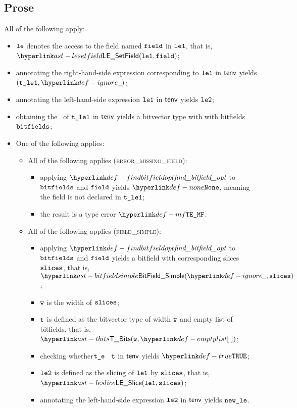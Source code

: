 \subsection{Prose}
All of the following apply:
\begin{itemize}
  \item $\texttt{le}$ denotes the access to the field named $\texttt{field}$ in $\texttt{le1}$, that is, \\ $\LESetField(\vleone, \field)$;
  \item annotating the right-hand-side expression corresponding to $\texttt{le1}$ in $\textsf{tenv}$ yields \\ $(\vtleone, \Ignore)$\ProseOrTypeError;
  \item annotating the left-hand-side expression $\texttt{le1}$ in $\textsf{tenv}$ yields $\texttt{le2}$\ProseOrTypeError;
  \item obtaining the \structure\ of $\texttt{t\_le1}$ in $\textsf{tenv}$ yields a bitvector type with with bitfields $\texttt{bitfields}$\ProseOrTypeError;
  \item One of the following applies:
  \begin{itemize}
    \item All of the following applies (\textsc{error\_missing\_field}):
    \begin{itemize}
      \item applying $\findbitfieldopt$ to $\texttt{bitfields}$ and $\texttt{field}$ yields $\None$, meaning the field is not declared
            in $\texttt{t\_le1}$;
      \item the result is a type error $\MissingField$.
    \end{itemize}

    \item All of the following applies (\textsc{field\_simple}):
    \begin{itemize}
      \item applying $\findbitfieldopt$ to $\texttt{bitfields}$ and $\texttt{field}$ yields a bitfield with corresponding slices $\texttt{slices}$,
            that is, $\BitFieldSimple(\Ignore, \slices)$;
      \item $\texttt{w}$ is the width of $\texttt{slices}$;
      \item $\texttt{t}$ is defined as the bitvector type of width $\texttt{w}$ and empty list of bitfields, that is, $\TBits(\vw, \emptylist)$;
      \item checking whether$\texttt{t\_e}$ \typesatisfies\ $\texttt{t}$ in $\textsf{tenv}$ yields $\True$\ProseOrTypeError;
      \item $\texttt{le2}$ is defined as the slicing of $\texttt{le1}$ by $\texttt{slices}$, that is, \\ $\LESlice(\vleone, \slices)$;
      \item annotating the left-hand-side expression $\texttt{le2}$ in $\textsf{tenv}$ yields $\texttt{new\_le}$\ProseOrTypeError.
    \end{itemize}


\end{itemize}
\end{itemize}
